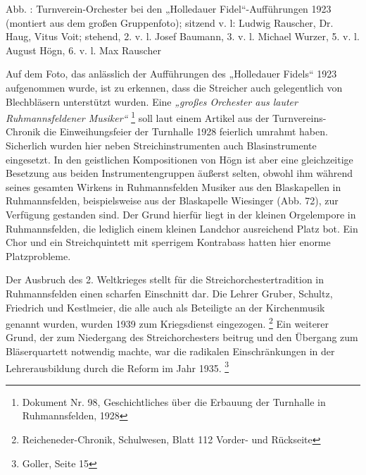 \documentclass[a4paper]{article}
\newcommand\zitat[1]{\textit{#1}}
\newcounter{Abb}
\renewcommand\theAbb{\arabic{Abb}}
\begin{document}
Abb. \stepcounter{Abb}{\theAbb}: Turnverein-Orchester bei den
„Holledauer Fidel“-Aufführungen 1923 (montiert aus dem großen
Gruppenfoto); sitzend v. l: Ludwig Rauscher, Dr. Haug, Vitus Voit;
stehend, 2. v. l. Josef Baumann, 3. v. l. Michael Wurzer, 5. v. l.
August Högn, 6. v. l. Max Rauscher

Auf dem Foto, das anlässlich der Aufführungen des „Holledauer Fidels“
1923 aufgenommen wurde, ist zu erkennen, dass die Streicher auch
gelegentlich von Blechbläsern unterstützt wurden. Eine
\zitat{„großes Orchester aus lauter Ruhmannsfeldener
Musiker“}  \footnote{Dokument Nr. 98, Geschichtliches über die Erbauung
der Turnhalle in Ruhmannsfelden, 1928} soll laut einem Artikel aus der
Turnvereins-Chronik die Einweihungsfeier der Turnhalle 1928 feierlich
umrahmt haben. Sicherlich wurden hier neben Streichinstrumenten auch
Blasinstrumente eingesetzt. In den geistlichen Kompositionen von Högn
ist aber eine gleichzeitige Besetzung aus beiden Instrumentengruppen
äußerst selten, obwohl ihm während seines gesamten Wirkens in
Ruhmannsfelden Musiker aus den Blaskapellen in Ruhmannsfelden,
beispielsweise aus der Blaskapelle Wiesinger (Abb. 72), zur Verfügung
gestanden sind. Der Grund hierfür liegt in der kleinen Orgelempore in
Ruhmannsfelden, die lediglich einem kleinen Landchor ausreichend Platz
bot. Ein Chor und ein Streichquintett mit sperrigem Kontrabass hatten
hier enorme Platzprobleme.

Der Ausbruch des 2. Weltkrieges stellt für die Streichorchestertradition
in Ruhmannsfelden einen scharfen Einschnitt dar. Die Lehrer Gruber,
Schultz, Friedrich und Kestlmeier, die alle auch als Beteiligte an der
Kirchenmusik genannt wurden, wurden 1939 zum Kriegsdienst
eingezogen. \footnote{Reicheneder-Chronik, Schulwesen, Blatt 112
Vorder- und Rückseite} Ein weiterer Grund, der zum Niedergang des
Streichorchesters beitrug und den Übergang zum Bläserquartett notwendig
machte, war die radikalen Einschränkungen in der Lehrerausbildung durch
die Reform im Jahr 1935. \footnote{Goller, Seite 15}
\end{document}
